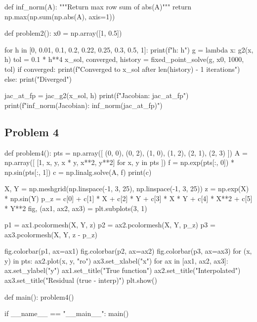 \documentclass{homework}
\begin{document}
\begin{python}
def inf_norm(A):
    """Return max row sum of abs(A)"""
    return np.max(np.sum(np.abs(A), axis=1))



def problem2():
    x0 = np.array([1, 0.5])

    for h in [0, 0.01, 0.1, 0.2, 0.22, 0.25, 0.3, 0.5, 1]:
        print(f"h: {h}")
        g = lambda x: g2(x, h)
        tol = 0.1 * h**4
        x_sol, converged, history = fixed_point_solve(g, x0, 1000, tol)
        if converged:
            print(f"Converged to {x_sol} after {len(history) - 1} iterations")
        else:
            print("Diverged")


        jac_at_fp = jac_g2(x_sol, h)
        print(f"Jacobian: {jac_at_fp}")
        print(f"inf_norm(Jacobian): {inf_norm(jac_at_fp)}")




\end{python}
\subsection{Problem 4}

\begin{python}
def problem4():
    pts = np.array([
        (0, 0),
        (0, 2),
        (1, 0),
        (1, 2),
        (2, 1),
        (2, 3)
    ])
    A = np.array([
        [1, x, y, x * y, x**2, y**2] for x, y in pts
    ])
    f = np.exp(pts[:, 0]) * np.sin(pts[:, 1])
    c = np.linalg.solve(A, f)
    print(c)

    X, Y = np.meshgrid(np.linspace(-1, 3, 25), np.linspace(-1, 3, 25))
    z = np.exp(X) * np.sin(Y)
    p_z = c[0] + c[1] * X + c[2] * Y + c[3] * X * Y + c[4] * X**2 + c[5] * Y**2
    fig, (ax1, ax2, ax3) = plt.subplots(3, 1)

    p1 = ax1.pcolormesh(X, Y, z)
    p2 = ax2.pcolormesh(X, Y, p_z)
    p3 = ax3.pcolormesh(X, Y, z - p_z)

    fig.colorbar(p1, ax=ax1)
    fig.colorbar(p2, ax=ax2)
    fig.colorbar(p3, ax=ax3)
    for (x, y) in pts:
        ax2.plot(x, y, "ro")
    ax3.set_xlabel("x")
    for ax in [ax1, ax2, ax3]:
        ax.set_ylabel("y")
    ax1.set_title("True function")
    ax2.set_title("Interpolated")
    ax3.set_title("Residual (true - interp)")
    plt.show()




def main():
    problem4()


if __name__ == "__main__":
    main()


\end{python}
\end{document}
